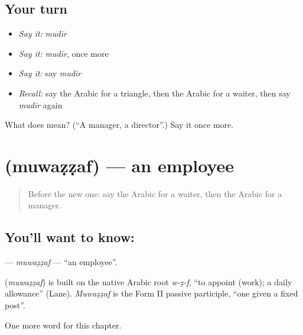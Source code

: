 \subsection*{Your turn}
\begin{itemize}
\raggedright
  \item \emph{Say it:} \emph{mudīr}
  \item \emph{Say it:} \emph{mudīr}, once more
  \item \emph{Say it:} say \emph{mudīr}
  \item \emph{Recall:} say the Arabic for a triangle, then the Arabic for a waiter, then say \emph{mudīr} again
\end{itemize}

\begin{tcolorbox}[breakable,colback=teal!4,colframe=teal!35!black,title={Before you move on}]
What does  mean? (\textquotedblleft{}A manager, a director\textquotedblright{}.) Say it once more.
\end{tcolorbox}
\section[\texorpdfstring{\ar{موظف} (muwaẓẓaf)}{موظف (muwaẓẓaf)}]{ (muwaẓẓaf) — an employee}

\label{lesson:AR-C251-muwazzaf}



\begin{quote}
Before the new one: say the Arabic for a waiter, then the Arabic for a manager.
\end{quote}

\subsection*{You'll want to know: }
\textbf{} — \emph{muwaẓẓaf} — \textquotedblleft{}an employee\textquotedblright{}.

\begin{cousinweb}
\textbf{} (\emph{muwaẓẓaf}) is built on the native Arabic root \emph{w-ẓ-f}, \textquotedblleft{}to appoint (work); a daily allowance\textquotedblright{} (Lane). \emph{Muwaẓẓaf} is the Form II passive participle, \textquotedblleft{}one given a fixed post\textquotedblright{}.
\end{cousinweb}

\begin{grammarlens}[title={What you've built}]
One more word for this chapter.
\end{grammarlens}

